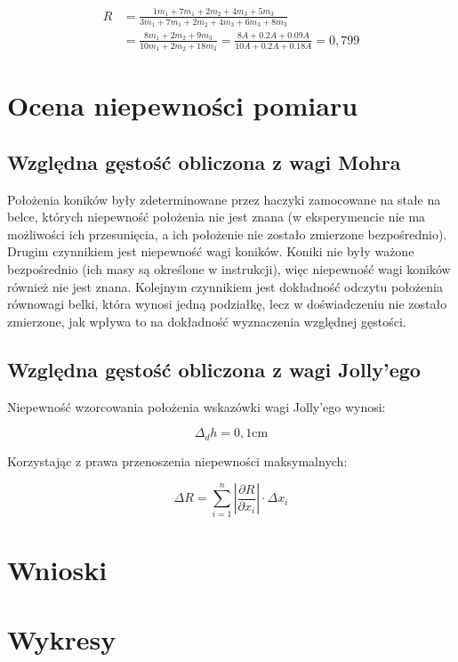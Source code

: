 \documentclass[a4paper,12pt]{article}
\begin{document}
\begin{align*}
    R & = \frac{1 m_1 + 7 m_1 + 2 m_2 + 4 m_3 + 5 m_3}{3 m_1 + 7 m_1 + 2 m_2 + 4 m_3 + 6 m_3 + 8 m_3}                            \\
      & = \frac{8 m_1 + 2 m_2 + 9 m_3}{10 m_1 + 2 m_2 + 18 m_3}  = \frac{8 A + 0.2 A + 0.09 A}{10 A + 0.2 A + 0.18 A}  = 0{,}799
\end{align*}



\section{Ocena niepewności pomiaru}



\subsection{Względna gęstość obliczona z wagi Mohra}

Położenia koników były zdeterminowane przez haczyki zamocowane na stałe na belce, których niepewność położenia nie jest znana (w eksperymencie nie ma możliwości ich przesunięcia, a ich położenie nie zostało zmierzone bezpośrednio). Drugim czynnikiem jest niepewność wagi koników. Koniki nie były ważone bezpośrednio (ich masy są określone w instrukcji), więc niepewność wagi koników również nie jest znana. Kolejnym czynnikiem jest dokładność odczytu położenia równowagi belki, która wynosi jedną podziałkę, lecz w doświadczeniu nie zostało zmierzone, jak wpływa to na dokładność wyznaczenia względnej gęstości.

\subsection{Względna gęstość obliczona z wagi Jolly'ego}

Niepewność wzorcowania położenia wskazówki wagi Jolly'ego wynosi:

\begin{equation*}
    \Delta_d h = 0{,}1 \text{cm}
\end{equation*}

Korzystając z prawa przenoszenia niepewności maksymalnych:

\begin{equation}
    \Delta R = \sum_{i=1}^{n} \left | \frac{\partial R}{\partial x_i} \right | \cdot \Delta x_i
\end{equation}



\section{Wnioski}

\section{Wykresy}



\end{document}
